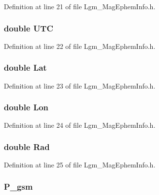 Definition at line 21 of file Lgm\_\-MagEphemInfo.h.\hypertarget{struct_lgm___mag_ephem_info_4eccefabe940625eb9277991aa138a38}{
\subsubsection[{UTC}]{\setlength{\rightskip}{0pt plus 5cm}double {\bf UTC}}}
\label{struct_lgm___mag_ephem_info_4eccefabe940625eb9277991aa138a38}




Definition at line 22 of file Lgm\_\-MagEphemInfo.h.\hypertarget{struct_lgm___mag_ephem_info_0db4289c0b4f63b151634b17a1718879}{
\subsubsection[{Lat}]{\setlength{\rightskip}{0pt plus 5cm}double {\bf Lat}}}
\label{struct_lgm___mag_ephem_info_0db4289c0b4f63b151634b17a1718879}




Definition at line 23 of file Lgm\_\-MagEphemInfo.h.\hypertarget{struct_lgm___mag_ephem_info_19c0faefc29efbada475c057d15844d6}{
\subsubsection[{Lon}]{\setlength{\rightskip}{0pt plus 5cm}double {\bf Lon}}}
\label{struct_lgm___mag_ephem_info_19c0faefc29efbada475c057d15844d6}




Definition at line 24 of file Lgm\_\-MagEphemInfo.h.\hypertarget{struct_lgm___mag_ephem_info_860bef50013f57ab1a6437b7986a9487}{
\subsubsection[{Rad}]{\setlength{\rightskip}{0pt plus 5cm}double {\bf Rad}}}
\label{struct_lgm___mag_ephem_info_860bef50013f57ab1a6437b7986a9487}




Definition at line 25 of file Lgm\_\-MagEphemInfo.h.\hypertarget{struct_lgm___mag_ephem_info_8a1a3f856fc793f9b4289bbf1d4c7f2f}{
\subsubsection[{P\_\-gsm}]{ {\bf P\_\-gsm}}}
\label{struct_lgm___mag_ephem_info_8a1a3f856fc793f9b4289bbf1d4c7f2f}





